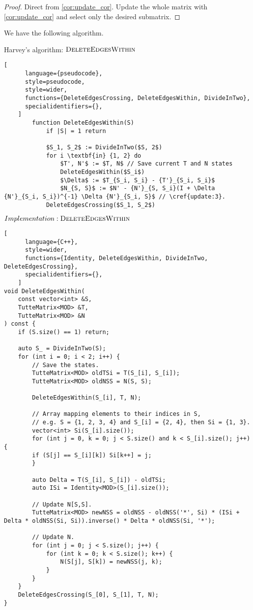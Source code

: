 \begin{proof}
    Direct from \cref{cor:update_cor}. Update the whole matrix with \ref{cor:update_cor} and select only the desired submatrix.
\end{proof}

We have the following algorithm.

\begin{programruledcaption}{Harvey's algorithm: \(\textsc{DeleteEdgesWithin}\)}
    \begin{lstlisting}[
      language={pseudocode},
      style=pseudocode,
      style=wider,
      functions={DeleteEdgesCrossing, DeleteEdgesWithin, DivideInTwo},
      specialidentifiers={},
    ]
        function DeleteEdgesWithin(S)
            if |S| = 1 return

            $S_1, S_2$ := DivideInTwo($S, 2$)
            for i \textbf{in} {1, 2} do
                $T', N'$ := $T, N$ // Save current T and N states
                DeleteEdgesWithin($S_i$)
                $\Delta$ := $T_{S_i, S_i} - {T'}_{S_i, S_i}$
                $N_{S, S}$ := $N' - {N'}_{S, S_i}(I + \Delta {N'}_{S_i, S_i})^{-1} \Delta {N'}_{S_i, S}$ // \cref{update:3}. 
            DeleteEdgesCrossing($S_1, S_2$)
    \end{lstlisting}
\end{programruledcaption}

\begin{programruledcaption}{\(Implementation: \textsc{DeleteEdgesWithin}\)}
    \begin{lstlisting}[
      language={C++},
      style=wider,
      functions={Identity, DeleteEdgesWithin, DivideInTwo, DeleteEdgesCrossing},
      specialidentifiers={},
    ]
void DeleteEdgesWithin(
    const vector<int> &S, 
    TutteMatrix<MOD> &T, 
    TutteMatrix<MOD> &N
) const {
    if (S.size() == 1) return;

    auto S_ = DivideInTwo(S);
    for (int i = 0; i < 2; i++) {
        // Save the states.
        TutteMatrix<MOD> oldTSi = T(S_[i], S_[i]);
        TutteMatrix<MOD> oldNSS = N(S, S);

        DeleteEdgesWithin(S_[i], T, N);

        // Array mapping elements to their indices in S,
        // e.g. S = {1, 2, 3, 4} and S_[i] = {2, 4}, then Si = {1, 3}.
        vector<int> Si(S_[i].size());
        for (int j = 0, k = 0; j < S.size() and k < S_[i].size(); j++) {
        if (S[j] == S_[i][k]) Si[k++] = j;
        }

        auto Delta = T(S_[i], S_[i]) - oldTSi;
        auto ISi = Identity<MOD>(S_[i].size());

        // Update N[S,S].
        TutteMatrix<MOD> newNSS = oldNSS - oldNSS('*', Si) * (ISi + Delta * oldNSS(Si, Si)).inverse() * Delta * oldNSS(Si, '*');

        // Update N.
        for (int j = 0; j < S.size(); j++) {
            for (int k = 0; k < S.size(); k++) {
                N(S[j], S[k]) = newNSS(j, k);
            }
        }
    }
    DeleteEdgesCrossing(S_[0], S_[1], T, N);
}
    \end{lstlisting}
\end{programruledcaption}

